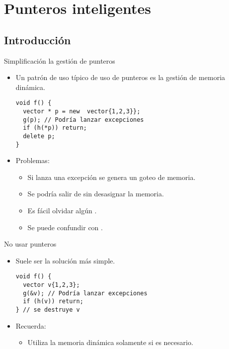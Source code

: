 \section{Punteros inteligentes}

\subsection{Introducción}

\begin{frame}[fragile]{Simplificación la gestión de punteros}
\begin{itemize}
  \item Un patrón de uso típico de uso de punteros es la gestión de memoria dinámica.
\begin{lstlisting}
void f() {
  vector * p = new  vector{1,2,3}};
  g(p); // Podría lanzar excepciones
  if (h(*p)) return;
  delete p;
}
\end{lstlisting}
  \item Problemas:
    \begin{itemize}
      \item Si  lanza una excepción se genera un goteo de memoria.
      \item Se podría salir de  sin desasignar la memoria.
      \item Es fácil olvidar algún .
      \item Se puede confundir  con .
    \end{itemize}
\end{itemize}
\end{frame}

\begin{frame}[t,fragile]{No usar punteros}
\begin{itemize}
  \item Suele ser la solución más simple.
\begin{lstlisting}
void f() {
  vector v{1,2,3};
  g(&v); // Podría lanzar excepciones
  if (h(v)) return;
} // se destruye v
\end{lstlisting}
  \item Recuerda:
    \begin{itemize}
      \item Utiliza la memoria dinámica solamente si es necesario.
    \end{itemize}
\end{itemize}
\end{frame}

